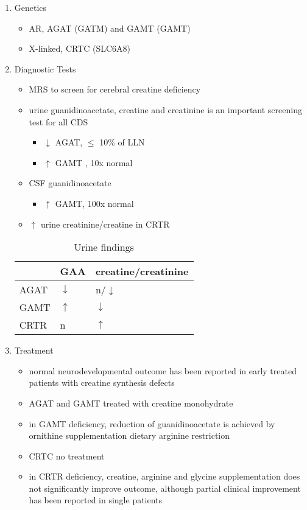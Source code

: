 \documentclass{scrartcl}
\begin{document}
\begin{enumerate}
\item Genetics
\label{sec:org31f9775}
\begin{itemize}
\item AR, AGAT (GATM) and GAMT (GAMT)
\item X-linked, CRTC (SLC6A8)
\end{itemize}
\item Diagnostic Tests
\label{sec:orgd8cf3f9}
\begin{itemize}
\item MRS to screen for cerebral creatine deficiency
\item urine guanidinoacetate, creatine and creatinine is an important
screening test for all CDS
\begin{itemize}
\item \(\downarrow\) AGAT, \(\le\) 10\% of LLN
\item \(\uparrow\) GAMT , 10x normal
\end{itemize}
\item CSF guanidinoacetate
\begin{itemize}
\item \(\uparrow\) GAMT, 100x normal
\end{itemize}
\item \(\uparrow\) urine creatinine/creatine in CRTR
\end{itemize}


\begin{table}[htbp]
\caption{\label{tab:orgf9e6488}
Urine findings}
\centering
\begin{tabular}{lll}
 & GAA & creatine/creatinine\\
\hline
AGAT & \(\downarrow\) & n/\(\downarrow\)\\
GAMT & \(\uparrow\) & \(\downarrow\)\\
CRTR & n & \(\uparrow\)\\
\end{tabular}
\end{table}

\item Treatment
\label{sec:org3e289e3}
\begin{itemize}
\item normal neurodevelopmental outcome has been reported in early treated
patients with creatine synthesis defects
\item AGAT and GAMT treated with creatine monohydrate
\item in GAMT deficiency, reduction of guanidinoacetate is achieved by
ornithine supplementation \textpm{} dietary arginine restriction
\item CRTC no treatment
\item in CRTR deficiency, creatine, arginine and glycine supplementation
does not significantly improve outcome, although partial clinical
improvement has been reported in single patients
\end{itemize}
\end{enumerate}
\end{document}
